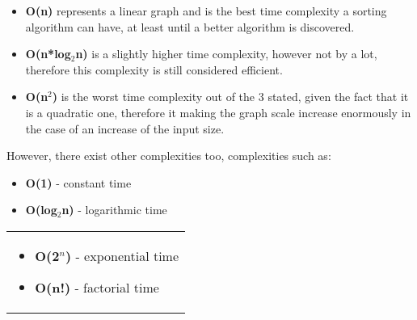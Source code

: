 \documentclass{article}
\begin{document}
\begin{itemize}
\item \textbf{O(n)} represents a linear graph and is the best time complexity a sorting algorithm can have, at least until a better algorithm is discovered. 


\item \textbf{O(n*log$_2$n)} is a slightly higher time complexity, however not by a lot, therefore this complexity is still considered efficient.


\item \textbf{O(n$^2$)} is the worst time complexity out of the 3 stated, given the fact that it is a quadratic one, therefore it making the graph scale increase enormously in the case of an increase of the input size.
\end{itemize}

However, there exist other complexities too, complexities such as:
\newline
\begin{minipage}{0.45\textwidth}
\begin{itemize}
  \item \textbf{O(1)} - constant time
  \item \textbf{O(log$_2$n)} - logarithmic time
\end{itemize}
\end{minipage}%
\hfill
\begin{minipage}{0.45\textwidth}
\begin{tabular}{p{\textwidth}}
\begin{itemize}
    \item \textbf{O(2$^{n}$)} - exponential time
    \item \textbf{O(n!)} - factorial time
\end{itemize}
\end{tabular}
\end{minipage}%


\clearpage
\end{document}
